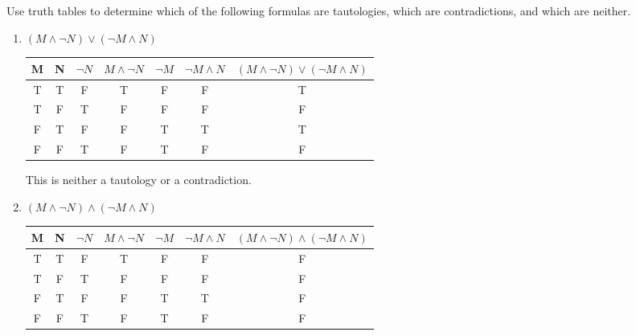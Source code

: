 \begin{prob}
Use truth tables to determine which of the following formulas are tautologies, which are contradictions, and which are neither.
\begin{enumerate}
\item $ (M \wedge \neg N) \vee ( \neg M \wedge N) $\\
\begin{center}
\begin{tabular}{|c|c|c|c|c|c|c|} 
\hline
M & N & $ \neg N $ & $ M \wedge \neg N $ & $ \neg M $ & $ \neg M \wedge N $ & $ (M \wedge \neg N) \vee ( \neg M \wedge N) $ \\
\hline
T & T & F          & T                   & F          & F                   & T                                             \\
T & F & T          & F                   & F          & F                   & F                                             \\
F & T & F          & F                   & T          & T                   & T                                             \\
F & F & T          & F                   & T          & F                   & F                                              \\
\hline
\end{tabular}
\end{center}
This is neither a tautology or a contradiction.
\item $ (M \wedge \neg N) \wedge ( \neg M \wedge N) $ \\
\begin{center}
\begin{tabular}{|c|c|c|c|c|c|c|} 
\hline
M & N & $ \neg N $ & $ M \wedge \neg N $ & $ \neg M $ & $ \neg M \wedge N $ & $ (M \wedge \neg N) \wedge ( \neg M \wedge N) $ \\
\hline
T & T & F          & T                   & F          & F                   & F                                               \\
T & F & T          & F                   & F          & F                   & F                                               \\
F & T & F          & F                   & T          & T                   & F                                               \\
F & F & T          & F                   & T          & F                   & F                                               \\

\end{tabular}
\end{center}
\end{enumerate}
\end{prob}

